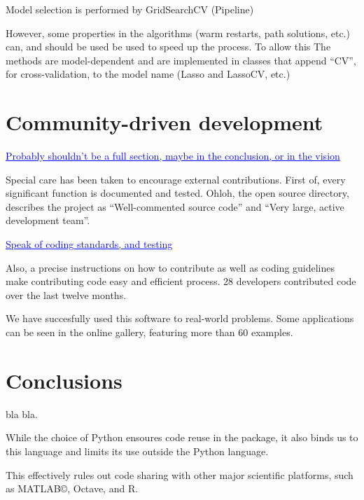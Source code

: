 \documentclass[twoside,11pt]{article}
\newcommand{\GAEL}[1]{\textcolor{blue}{\uline{#1}}}
\begin{document}
Model selection is performed by GridSearchCV (Pipeline)

However, some properties in the algorithms (warm restarts, path
solutions, etc.) can, and should be used be used to speed up the
process. To allow this The methods are model-dependent and are
implemented in classes that append ``CV'', for cross-validation, to
the model name (Lasso and LassoCV, etc.)


\section{Community-driven development}

\GAEL{Probably shouldn't be a full section, maybe in the conclusion, or
in the vision}

Special care has been taken to encourage external contributions. First
of, every significant function is documented and tested.  Ohloh, the
open source directory, describes the project as ``Well-commented
source code'' and ``Very large, active development team''.

\GAEL{Speak of coding standards, and testing} 

Also, a precise instructions on how to contribute as well as coding
guidelines make contributing code easy and efficient process. 28
developers contributed code over the last twelve months.

We have succesfully used this software to real-world problems. Some
applications can be seen in the online gallery, featuring more than 60
examples.



\section{Conclusions}

bla bla.

While the choice of Python ensoures code reuse in the package, it also
binds us to this language and limits its use outside the Python
language.

This effectively rules out code sharing with other major scientific
platforms, such as MATLAB©, Octave, and R.
\end{document}
